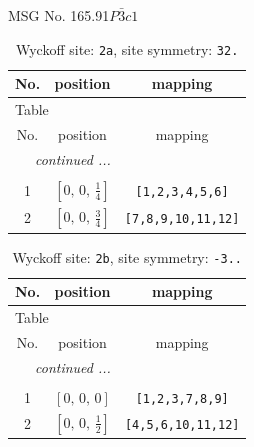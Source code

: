 \documentclass[fleqn,8pt]{jsarticle}
\begin{document}
\setcounter{MaxMatrixCols}{32}

\renewcommand{\tablename}{Table~}
\renewcommand{\figurename}{Figure~}
\begin{center}
\LARGE
MSG No. 165.91\quad$P\bar{3}c1$
\end{center}
\renewcommand{\arraystretch}{1.2}
\begin{longtable}{ccc}
\caption{Wyckoff site: {\tt 2a}, site symmetry: {\tt 32.}}
 \\
 \hline \hline
No. & position & mapping \\ \hline \endfirsthead

\multicolumn{2}{l}{\tablename\ \thetable{}} \\
 \hline \hline
No. & position & mapping \\ \hline \endhead

 \hline \hline
\multicolumn{2}{r}{\footnotesize\it continued ...} \\ \endfoot

 \hline \hline
\multicolumn{2}{r}{} \\ \endlastfoot

1 & $\left[ 0,\, 0,\, \frac{1}{4} \right]$ & {\tt [1,2,3,4,5,6]} \\ \hline
2 & $\left[ 0,\, 0,\, \frac{3}{4} \right]$ & {\tt [7,8,9,10,11,12]} \\
\end{longtable}
\renewcommand{\arraystretch}{1.2}
\begin{longtable}{ccc}
\caption{Wyckoff site: {\tt 2b}, site symmetry: {\tt -3..}}
 \\
 \hline \hline
No. & position & mapping \\ \hline \endfirsthead

\multicolumn{2}{l}{\tablename\ \thetable{}} \\
 \hline \hline
No. & position & mapping \\ \hline \endhead

 \hline \hline
\multicolumn{2}{r}{\footnotesize\it continued ...} \\ \endfoot

 \hline \hline
\multicolumn{2}{r}{} \\ \endlastfoot

1 & $\left[ 0,\, 0,\, 0 \right]$ & {\tt [1,2,3,7,8,9]} \\ \hline
2 & $\left[ 0,\, 0,\, \frac{1}{2} \right]$ & {\tt [4,5,6,10,11,12]} \\
\end{longtable}
\renewcommand{\arraystretch}{1.2}
\end{document}
